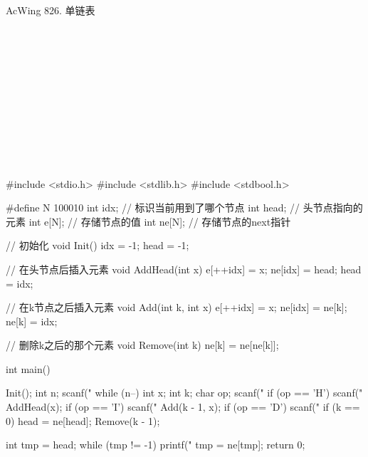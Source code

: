 \begin{titledbox}{AcWing 826. 单链表}
    \begin{inputblock}
         \\
         \\
         \\
         \\
         \\
         \\
         \\
         \\
         \\
         \\
    \end{inputblock}
    \begin{outputblock}
    \end{outputblock}
\end{titledbox}

\begin{mycpptwocol}
    #include <stdio.h>
    #include <stdlib.h>
    #include <stdbool.h>

    #define N 100010
    int idx; // 标识当前用到了哪个节点
    int head; // 头节点指向的元素
    int e[N]; // 存储节点的值
    int ne[N]; // 存储节点的next指针

    // 初始化
    void Init() {
        idx = -1;
        head = -1;
    }

    // 在头节点后插入元素
    void AddHead(int x) {
        e[++idx] = x;
        ne[idx] = head;
        head = idx;
    }

    // 在k节点之后插入元素
    void Add(int k, int x) {
        e[++idx] = x;
        ne[idx] = ne[k];
        ne[k] = idx;
    }

    // 删除k之后的那个元素
    void Remove(int k) {
        ne[k] = ne[ne[k]];
    }

    int main() {
        Init();
        int n;
        scanf("%
        while (n--) {
            int x;
            int k;
            char op;
            scanf(" %
            if (op == 'H') {
                scanf("%
                AddHead(x);
            }
            if (op == 'I') {
                scanf("%
                Add(k - 1, x);
            }
            if (op == 'D') {
                scanf("%
                if (k == 0) {
                    head = ne[head];
                }
                Remove(k - 1);
            }
        }

        int tmp = head;
        while (tmp != -1) {
            printf("%
            tmp = ne[tmp];
        }
        return 0;
    }
\end{mycpptwocol}


